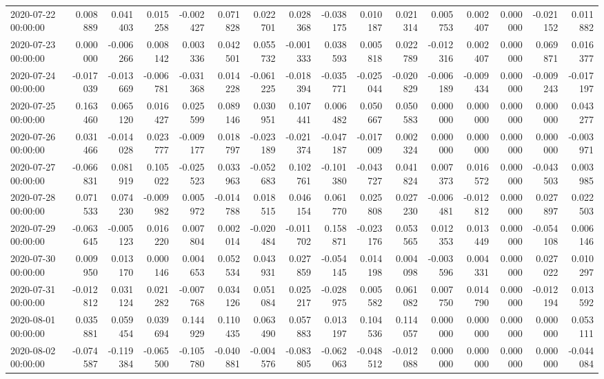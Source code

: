 \begin{tabular}{lrrrrrrrrrrrrrrr}
2020-07-22 00:00:00 & 0.008889 & 0.041403 & 0.015258 & -0.002427 & 0.071828 & 0.022701 & 0.028368 & -0.038175 & 0.010187 & 0.021314 & 0.005753 & 0.002407 & 0.000000 & -0.021152 & 0.011882 \\
2020-07-23 00:00:00 & 0.000000 & -0.006266 & 0.008142 & 0.003336 & 0.042501 & 0.055732 & -0.001333 & 0.038593 & 0.005818 & 0.022789 & -0.012316 & 0.002407 & 0.000000 & 0.069871 & 0.016377 \\
2020-07-24 00:00:00 & -0.017039 & -0.013669 & -0.006781 & -0.031368 & 0.014228 & -0.061225 & -0.018394 & -0.035771 & -0.025044 & -0.020829 & -0.006189 & -0.009434 & 0.000000 & -0.009243 & -0.017197 \\
2020-07-25 00:00:00 & 0.163460 & 0.065120 & 0.016427 & 0.025599 & 0.089146 & 0.030951 & 0.107441 & 0.006482 & 0.050667 & 0.050583 & 0.000000 & 0.000000 & 0.000000 & 0.000000 & 0.043277 \\
2020-07-26 00:00:00 & 0.031466 & -0.014028 & 0.023777 & -0.009177 & 0.018797 & -0.023189 & -0.021374 & -0.047187 & -0.017009 & 0.002324 & 0.000000 & 0.000000 & 0.000000 & 0.000000 & -0.003971 \\
2020-07-27 00:00:00 & -0.066831 & 0.081919 & 0.105022 & -0.025523 & 0.033963 & -0.052683 & 0.102761 & -0.101380 & -0.043727 & 0.041824 & 0.007373 & 0.016572 & 0.000000 & -0.043503 & 0.003985 \\
2020-07-28 00:00:00 & 0.071533 & 0.074230 & -0.009982 & 0.005972 & -0.014788 & 0.018515 & 0.046154 & 0.061770 & 0.025808 & 0.027230 & -0.006481 & -0.012812 & 0.000000 & 0.027897 & 0.022503 \\
2020-07-29 00:00:00 & -0.063645 & -0.005123 & 0.016220 & 0.007804 & 0.002014 & -0.020484 & -0.011702 & 0.158871 & -0.023176 & 0.053565 & 0.012353 & 0.013449 & 0.000000 & -0.054108 & 0.006146 \\
2020-07-30 00:00:00 & 0.009950 & 0.013170 & 0.000146 & 0.004653 & 0.052534 & 0.043931 & 0.027859 & -0.054145 & 0.014198 & 0.004098 & -0.003596 & 0.004331 & 0.000000 & 0.027022 & 0.010297 \\
2020-07-31 00:00:00 & -0.012812 & 0.031124 & 0.021282 & -0.007768 & 0.034126 & 0.051084 & 0.025217 & -0.028975 & 0.005582 & 0.061082 & 0.007750 & 0.014790 & 0.000000 & -0.012194 & 0.013592 \\
2020-08-01 00:00:00 & 0.035881 & 0.059454 & 0.039694 & 0.144929 & 0.110435 & 0.063490 & 0.057883 & 0.013197 & 0.104536 & 0.114057 & 0.000000 & 0.000000 & 0.000000 & 0.000000 & 0.053111 \\
2020-08-02 00:00:00 & -0.074587 & -0.119384 & -0.065500 & -0.105780 & -0.040881 & -0.004576 & -0.083805 & -0.062063 & -0.048512 & -0.012088 & 0.000000 & 0.000000 & 0.000000 & 0.000000 & -0.044084 \\

\end{tabular}

